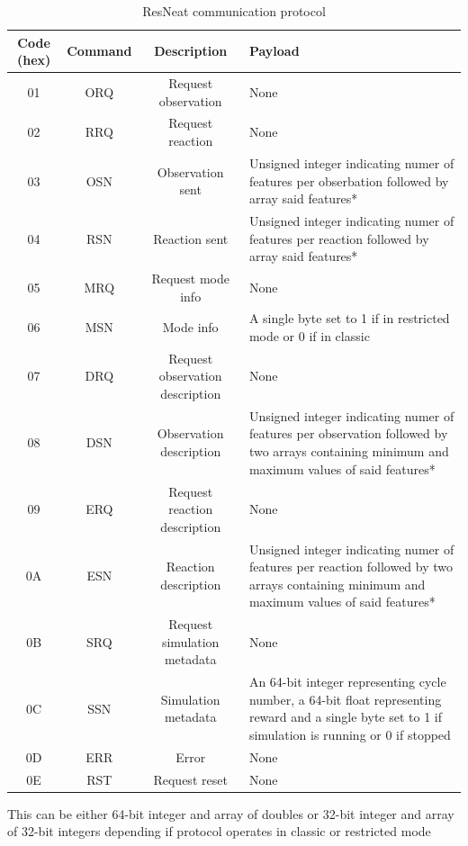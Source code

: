 \begin{table} 
	\centering
	\caption{ResNeat communication protocol}
	\label{tab:resneat-protocol}
	\begin{tabularx}{\textwidth}{cccX}
		\hline
		\hline
		Code (hex)& Command& Description& Payload\\
		\hline
		01& ORQ&  Request observation& None\\
		02& RRQ& Request reaction& None\\
		03& OSN& Observation sent& Unsigned integer indicating numer of features per obserbation 
		followed by array said features*\\
		04& RSN& Reaction sent& Unsigned integer indicating numer of features per reaction 
		followed by array said features*\\
		05& MRQ& Request mode info& None\\
		06& MSN& Mode info& A single byte set to 1 if in restricted mode or 0 if in classic\\
		07& DRQ& Request observation description& None\\
		08& DSN& Observation description& Unsigned integer indicating numer of features per observation 
		followed by two arrays containing minimum and maximum values of  said features*\\
		09& ERQ& Request reaction description& None\\
		0A& ESN& Reaction description& Unsigned integer indicating numer of features per reaction 
		followed by two arrays containing minimum and maximum values of  said features*\\
		0B& SRQ& Request simulation metadata& None\\
		0C& SSN& Simulation metadata& An 64-bit integer representing cycle number, a 64-bit float 
		representing reward and a single byte set to 1 if simulation is running or 0 if stopped\\
		0D& ERR& Error& None\\
		0E& RST& Request reset& None\\

		\hline
		\hline
	\end{tabularx}
	\newline
	{\footnotesize *This can be either 64-bit integer and array of doubles or 32-bit integer
	and array of 32-bit integers depending if protocol operates in classic or restricted mode}
\end{table}

